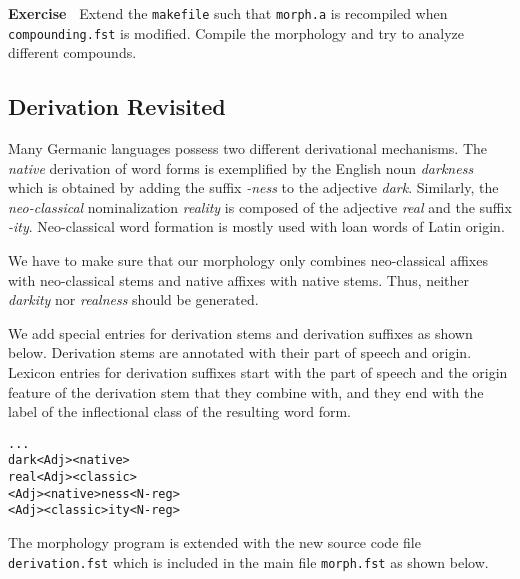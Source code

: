 \documentclass[11pt]{article}
\newenvironment{exercise}{

  \hrulefill\nopagebreak

  \textbf{Exercise~}}
{

  \nopagebreak\hrulefill\vspace{0.2cm}

}
\begin{document}
\begin{exercise}
  Extend the \texttt{makefile} such that \texttt{morph.a} is
  recompiled when \texttt{compounding.fst} is modified. Compile the
  morphology and try to analyze different compounds.
\end{exercise}


\subsection{Derivation Revisited}

Many Germanic languages possess two different derivational mechanisms.
The \emph{native} derivation of word forms is exemplified by the
English noun \emph{darkness} which is obtained by adding the suffix
\emph{-ness} to the adjective \emph{dark}.  Similarly, the
\emph{neo-classical} nominalization \emph{reality} is composed of the
adjective \emph{real} and the suffix \emph{-ity}. Neo-classical word
formation is mostly used with loan words of Latin origin.

We have to make sure that our morphology only combines neo-classical
affixes with neo-classical stems and native affixes with native stems.
Thus, neither \emph{darkity} nor \emph{realness} should be generated.

We add special entries for derivation stems and derivation suffixes as
shown below.  Derivation stems are annotated with their part of speech
and origin. Lexicon entries for derivation suffixes start with the
part of speech and the origin feature of the derivation stem that they
combine with, and they end with the label of the inflectional class of the
resulting word form.

\begin{verbatim}
...
dark<Adj><native>
real<Adj><classic>
<Adj><native>ness<N-reg>
<Adj><classic>ity<N-reg>
\end{verbatim}

The morphology program is extended with the new source code file
\texttt{derivation.fst} which is included in the main file
\texttt{morph.fst} as shown below.
\end{document}
